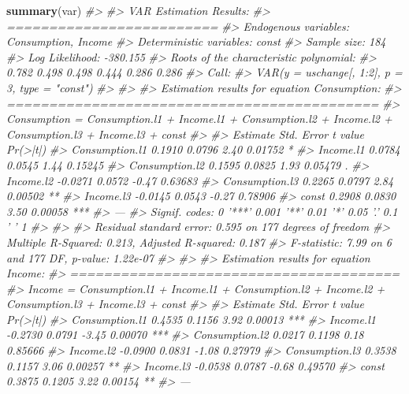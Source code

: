 \documentclass[]{book}
\newenvironment{Shaded}{\begin{snugshade}}{\end{snugshade}}
\newcommand{\CommentTok}[1]{\textcolor[rgb]{0.56,0.35,0.01}{\textit{#1}}}
\newcommand{\KeywordTok}[1]{\textcolor[rgb]{0.13,0.29,0.53}{\textbf{#1}}}
\newcommand{\NormalTok}[1]{#1}
\begin{document}
\begin{Shaded}
\begin{Highlighting}[]
\KeywordTok{summary}\NormalTok{(var)}
\CommentTok{#> }
\CommentTok{#> VAR Estimation Results:}
\CommentTok{#> ========================= }
\CommentTok{#> Endogenous variables: Consumption, Income }
\CommentTok{#> Deterministic variables: const }
\CommentTok{#> Sample size: 184 }
\CommentTok{#> Log Likelihood: -380.155 }
\CommentTok{#> Roots of the characteristic polynomial:}
\CommentTok{#> 0.782 0.498 0.498 0.444 0.286 0.286}
\CommentTok{#> Call:}
\CommentTok{#> VAR(y = uschange[, 1:2], p = 3, type = "const")}
\CommentTok{#> }
\CommentTok{#> }
\CommentTok{#> Estimation results for equation Consumption: }
\CommentTok{#> ============================================ }
\CommentTok{#> Consumption = Consumption.l1 + Income.l1 + Consumption.l2 + Income.l2 + Consumption.l3 + Income.l3 + const }
\CommentTok{#> }
\CommentTok{#>                Estimate Std. Error t value Pr(>|t|)    }
\CommentTok{#> Consumption.l1   0.1910     0.0796    2.40  0.01752 *  }
\CommentTok{#> Income.l1        0.0784     0.0545    1.44  0.15245    }
\CommentTok{#> Consumption.l2   0.1595     0.0825    1.93  0.05479 .  }
\CommentTok{#> Income.l2       -0.0271     0.0572   -0.47  0.63683    }
\CommentTok{#> Consumption.l3   0.2265     0.0797    2.84  0.00502 ** }
\CommentTok{#> Income.l3       -0.0145     0.0543   -0.27  0.78906    }
\CommentTok{#> const            0.2908     0.0830    3.50  0.00058 ***}
\CommentTok{#> ---}
\CommentTok{#> Signif. codes:  0 '***' 0.001 '**' 0.01 '*' 0.05 '.' 0.1 ' ' 1}
\CommentTok{#> }
\CommentTok{#> }
\CommentTok{#> Residual standard error: 0.595 on 177 degrees of freedom}
\CommentTok{#> Multiple R-Squared: 0.213,   Adjusted R-squared: 0.187 }
\CommentTok{#> F-statistic: 7.99 on 6 and 177 DF,  p-value: 1.22e-07 }
\CommentTok{#> }
\CommentTok{#> }
\CommentTok{#> Estimation results for equation Income: }
\CommentTok{#> ======================================= }
\CommentTok{#> Income = Consumption.l1 + Income.l1 + Consumption.l2 + Income.l2 + Consumption.l3 + Income.l3 + const }
\CommentTok{#> }
\CommentTok{#>                Estimate Std. Error t value Pr(>|t|)    }
\CommentTok{#> Consumption.l1   0.4535     0.1156    3.92  0.00013 ***}
\CommentTok{#> Income.l1       -0.2730     0.0791   -3.45  0.00070 ***}
\CommentTok{#> Consumption.l2   0.0217     0.1198    0.18  0.85666    }
\CommentTok{#> Income.l2       -0.0900     0.0831   -1.08  0.27979    }
\CommentTok{#> Consumption.l3   0.3538     0.1157    3.06  0.00257 ** }
\CommentTok{#> Income.l3       -0.0538     0.0787   -0.68  0.49570    }
\CommentTok{#> const            0.3875     0.1205    3.22  0.00154 ** }
\CommentTok{#> ---}

\end{Highlighting}
\end{Shaded}
\end{document}
